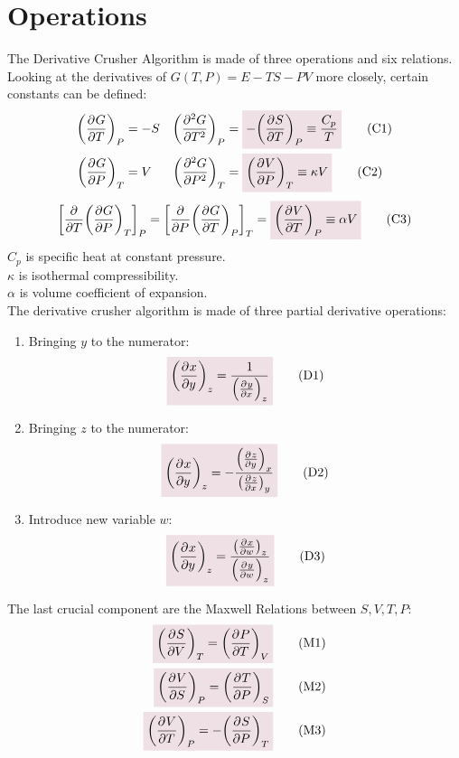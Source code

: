 \documentclass{article}
\begin{document}
    \section{Operations}
    The Derivative Crusher Algorithm is made of three operations and six relations. 
    Looking at the derivatives of $G(T,P)=E-TS-PV$ more closely, certain constants can be defined: 
    \begin{align*}
        \pder{G}{T}[P]&=-S & \pder[2]{G}{T}[P]&=\coloredanswer{-\pder{S}{T}[P]\equiv\frac{C_p}{T}}\tag{C1}
        \\
        \pder{G}{P}[T]&=V & \pder[2]{G}{P}[T]&=\coloredanswer{\pder{V}{P}[T]\equiv\kappa V}\tag{C2}
    \end{align*}
    \begin{equation*}
        \qty[\pder{T}\pder{G}{P}[T]]_{P}=\qty[\pder{P}\pder{G}{T}[P]]_{T}=\coloredanswer{\pder{V}{T}[P]\equiv\alpha V}\tag{C3}
    \end{equation*}
    $C_p$ is specific heat at constant pressure. 
    \\
    $\kappa$ is isothermal compressibility.
    \\
    $\alpha$ is volume coefficient of expansion.
    \\
    The derivative crusher algorithm is made of three partial derivative operations:
    \begin{enumerate}
        \item Bringing $y$ to the numerator:
        \begin{equation*}
            \coloredanswer{\pder{x}{y}[z]=\oo{\pder{y}{x}[z]}}\tag{D1}
        \end{equation*}
        \item Bringing $z$ to the numerator:
        \begin{equation*}
            \coloredanswer{\pder{x}{y}[z]=-\frac{\pder{z}{y}[x]}{\pder{z}{x}[y]}}\tag{D2}
        \end{equation*}
        \item Introduce new variable $w$:
        \begin{equation*}
            \coloredanswer{\pder{x}{y}[z]=\frac{\pder{x}{w}[z]}{\pder{y}{w}[z]}}\tag{D3}
        \end{equation*}
    \end{enumerate}
    The last crucial component are the Maxwell Relations between $S,V,T,P$:
    \begin{align*}
        \coloredanswer{\pder{S}{V}[T]=\pder{P}{T}[V]}\tag{M1}
        \\
        \coloredanswer{\pder{V}{S}[P]=\pder{T}{P}[S]}\tag{M2}
        \\
        \coloredanswer{\pder{V}{T}[P]=-\pder{S}{P}[T]}\tag{M3}
    \end{align*}
    \newpage
\end{document}
